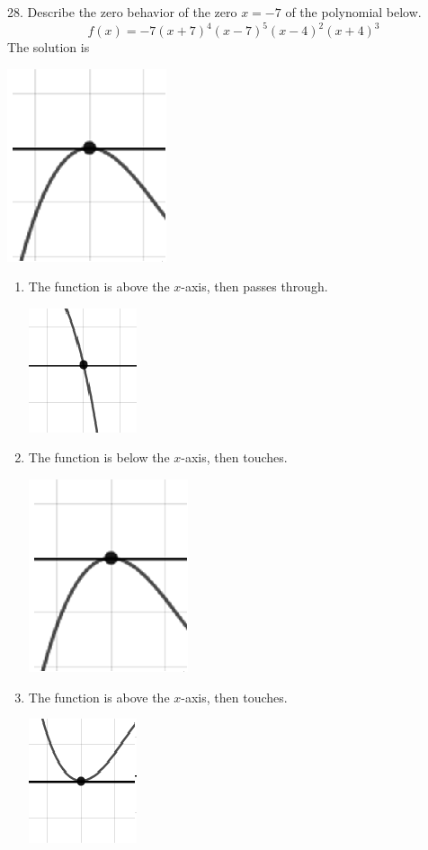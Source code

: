 \documentclass{article}[10pt]
\begin{document}
28. Describe the zero behavior of the zero $x = -7$ of the polynomial below.
$$ f(x) = -7(x + 7)^{4}(x - 7)^{5}(x - 4)^{2}(x + 4)^{3} $$ 
The solution is  
\begin{center}\includegraphics[scale=0.5]{../Figures/zeroBehaviorNegativeEven.png}\end{center}\begin{enumerate}[label=\Alph*.] 
\item The function is above the $x$-axis, then passes through. 
\begin{center}\includegraphics[scale=0.5]{../Figures/zeroBehaviorNegativeOdd.png}\end{center} 
 
\item The function is below the $x$-axis, then touches. 
\begin{center}\includegraphics[scale=0.5]{../Figures/zeroBehaviorNegativeEven.png}\end{center} 
 
\item The function is above the $x$-axis, then touches. 
\begin{center}\includegraphics[scale=0.5]{../Figures/zeroBehaviorPositiveEven.png}\end{center} 
 

\end{enumerate}
\end{document}
